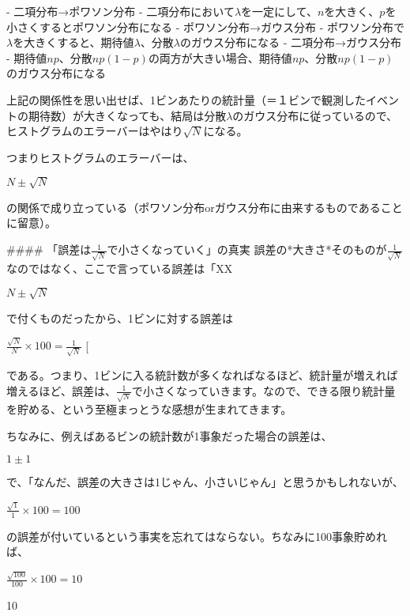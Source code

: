 \documentclass[uplatex]{jsarticle}
\begin{document}
- 二項分布→ポワソン分布
- 二項分布において$\lambda$を一定にして、$n$を大きく、$p$を小さくするとポワソン分布になる
- ポワソン分布→ガウス分布
- ポワソン分布で$\lambda$を大きくすると、期待値$\lambda$、分散$\lambda$のガウス分布になる
- 二項分布→ガウス分布
- 期待値$np$、分散$np(1-p)$の両方が大きい場合、期待値$np$、$分散np(1-p)$のガウス分布になる

上記の関係性を思い出せば、1ビンあたりの統計量（＝１ビンで観測したイベントの期待数）が大きくなっても、結局は分散$\lambda$のガウス分布に従っているので、ヒストグラムのエラーバーはやはり$\sqrt{N}$になる。

つまりヒストグラムのエラーバーは、

$N\pm\sqrt{N}$

の関係で成り立っている（ポワソン分布orガウス分布に由来するものであることに留意）。


#### 「誤差は$\frac{1}{\sqrt{N}}$で小さくなっていく」の真実
誤差の*大きさ*そのものが$\frac{1}{\sqrt{N}}$なのではなく、ここで言っている誤差は「XX%

$N\pm\sqrt{N}$

で付くものだったから、1ビンに対する誤差は

$\frac{\sqrt{N}}{N}\times 100 = \frac{1}{\sqrt{N}}$ [%

である。つまり、1ビンに入る統計数が多くなればなるほど、統計量が増えれば増えるほど、誤差は、$\frac{1}{\sqrt{N}}$で小さくなっていきます。なので、できる限り統計量を貯める、という至極まっとうな感想が生まれてきます。


ちなみに、例えばあるビンの統計数が1事象だった場合の誤差は、

$1\pm 1$

で、「なんだ、誤差の大きさは1じゃん、小さいじゃん」と思うかもしれないが、

$\frac{\sqrt{1}}{1}\times 100 = 100$ %

の誤差が付いているという事実を忘れてはならない。ちなみに100事象貯めれば、

$\frac{\sqrt{100}}{100}\times 100 = 10$ %

10%
\end{document}
